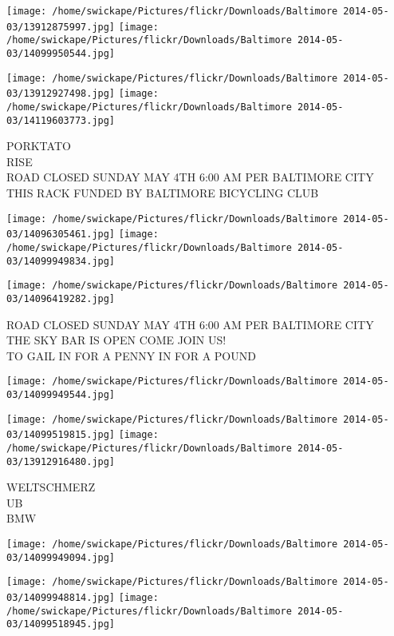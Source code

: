 \documentclass[10pt,letterpaper]{article}
\begin{document}
\texttt{[image: /home/swickape/Pictures/flickr/Downloads/Baltimore 2014-05-03/13912875997.jpg]}
\texttt{[image: /home/swickape/Pictures/flickr/Downloads/Baltimore 2014-05-03/14099950544.jpg]}

\texttt{[image: /home/swickape/Pictures/flickr/Downloads/Baltimore 2014-05-03/13912927498.jpg]}
\texttt{[image: /home/swickape/Pictures/flickr/Downloads/Baltimore 2014-05-03/14119603773.jpg]}

PORKTATO\\
RISE\\
ROAD CLOSED SUNDAY MAY 4TH 6:00 AM PER BALTIMORE CITY\\
THIS RACK FUNDED BY BALTIMORE BICYCLING CLUB\\
\pagebreak

\texttt{[image: /home/swickape/Pictures/flickr/Downloads/Baltimore 2014-05-03/14096305461.jpg]}
\texttt{[image: /home/swickape/Pictures/flickr/Downloads/Baltimore 2014-05-03/14099949834.jpg]}

\texttt{[image: /home/swickape/Pictures/flickr/Downloads/Baltimore 2014-05-03/14096419282.jpg]}

ROAD CLOSED SUNDAY MAY 4TH 6:00 AM PER BALTIMORE CITY\\
THE SKY BAR IS OPEN COME JOIN US!\\
TO GAIL IN FOR A PENNY IN FOR A POUND\\
\pagebreak

\texttt{[image: /home/swickape/Pictures/flickr/Downloads/Baltimore 2014-05-03/14099949544.jpg]}

\vspace{0.25in}
\texttt{[image: /home/swickape/Pictures/flickr/Downloads/Baltimore 2014-05-03/14099519815.jpg]}
\texttt{[image: /home/swickape/Pictures/flickr/Downloads/Baltimore 2014-05-03/13912916480.jpg]}

WELTSCHMERZ\\
UB\\
BMW\\
\pagebreak

\texttt{[image: /home/swickape/Pictures/flickr/Downloads/Baltimore 2014-05-03/14099949094.jpg]}

\vspace{0.25in}
\texttt{[image: /home/swickape/Pictures/flickr/Downloads/Baltimore 2014-05-03/14099948814.jpg]}
\texttt{[image: /home/swickape/Pictures/flickr/Downloads/Baltimore 2014-05-03/14099518945.jpg]}
\end{document}
